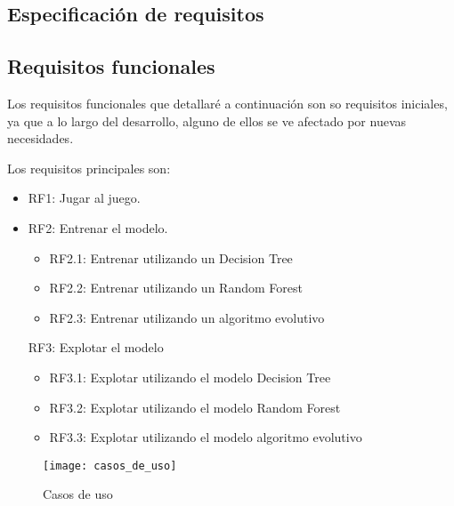 \subsection{Especificación de requisitos}

\subsection{Requisitos funcionales}
Los requisitos funcionales que detallaré a continuación son so requisitos iniciales, ya que a lo largo del desarrollo, alguno de ellos se ve afectado por nuevas necesidades.

Los requisitos principales son:
\begin{itemize}
    \item RF1: Jugar al juego.
    \item RF2: Entrenar el modelo.
        \begin{itemize}
            \item RF2.1: Entrenar utilizando un Decision Tree
            \item RF2.2: Entrenar utilizando un Random Forest
            \item RF2.3: Entrenar utilizando un algoritmo evolutivo
        \end{itemize}
    \itme RF3: Explotar el modelo
        \begin{itemize}
            \item RF3.1: Explotar utilizando el modelo Decision Tree
            \item RF3.2: Explotar utilizando el modelo Random Forest
            \item RF3.3: Explotar utilizando el modelo algoritmo evolutivo
        \end{itemize}
\end{itemize}


\begin{figure}[h!]
    \centering
    \texttt{[image: casos\_de\_uso]}
    \caption{Casos de uso}
    \label{fig:cuso}
\end{figure}




